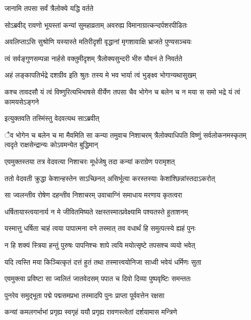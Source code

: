 \onelineshloka
{जानामि तपसा सर्वं त्रैलोक्ये यद्धि वर्तते} %

\twolineshloka
{सोऽब्रवीद् रावणो भूयस्तां कन्यां सुमहाव्रताम्}
{अवरुह्य विमानाग्रात्कन्दर्पशरपीडितः} %

\twolineshloka
{अवलिप्ताऽसि सुश्रोणि यस्यास्ते मतिरीदृशी}
{वृद्धानां मृगशावाक्षि भ्राजते पुण्यसञ्चयः} %

\twolineshloka
{त्वं सर्वङ्गुणसम्पन्ना नार्हसे वक्तुमीदृशम्}
{त्रैलोक्यसुन्दरी भीरु यौवनं ते निवर्तते} %

\twolineshloka
{अहं लङ्कापतिर्भद्रे दशग्रीव इति श्रुतः}
{तस्य मे भव भार्या त्वं भुङ्क्ष्व भोगान्यथासुखम्} %

\twolineshloka
{कश्च तावदसौ यं त्वं विष्णुरित्यभिभाषसे}
{वीर्येण तपसा चैव भोगेन च बलेन च न मया स समो भद्रे यं त्वं कामयसेऽङ्गने} %

\onelineshloka
{इत्युक्तवति तस्मिंस्तु वेदवत्यथ साऽब्रवीत्} %

\threelineshloka
{ैव भोगेन च बलेन च मा मैवमिति सा कन्या तमुवाच निशाचरम्}
{त्रैलोक्याधिपति विष्णुं सर्वलोकनमस्कृतम्}
{त्वदृते राक्षसेन्द्रान्यः कोऽवमन्येत बुद्धिमान्} %

\twolineshloka
{एवमुक्तस्तया तत्र वेदवत्या निशाचरः}
{मूर्धजेषु तदा कन्यां कराग्रेण परामृशत्} %

\twolineshloka
{ततो वेदवती क्रुद्धा केशान्हस्तेन साऽच्छिनत्}
{असिर्भूत्वा करस्तस्याः केशांश्छिन्नांस्तदाऽकरोत्} %

\twolineshloka
{सा ज्वलन्तीव रोषेण दहन्तीव निशाचरम्}
{उवाचाग्निं समाधाय मरणाय कृतत्वरा} %

\twolineshloka
{धर्षितायास्त्वयानार्य न मे जीवितमिष्यते}
{रक्षस्तस्मात्प्रवेक्ष्यामि पश्यतस्ते हुताशनम्} %

\twolineshloka
{यस्मात्तु धर्षिता चाहं त्वया पापात्मना वने}
{तस्मात् तव वधार्थं हि समुत्पत्स्ये ह्यहं पुनः} %

\twolineshloka
{न हि शक्यं स्त्रिया हन्तुं पुरुषः पापनिश्चः}
{शापे त्वयि मयोत्सृष्टे तपसश्च व्ययो भवेत्} %

\twolineshloka
{यदि त्वस्ति मया किञ्चित्कृतं दत्तं हुतं तथा}
{तस्मात्त्वयोनिजा साध्वी भवेयं धर्मिणः सुता} %

\twolineshloka
{एवमुक्त्वा प्रविष्टा सा ज्वलितं जातवेदसम्}
{पपात च दिवो दिव्या पुष्पवृष्टिः समन्ततः} %

\twolineshloka
{पुनरेव समुद्भूता पद्मे पद्मसमप्रभा}
{तस्मादपि पुनः प्राप्ता पूर्ववत्तेन रक्षसा} %

\twolineshloka
{कन्यां कमलगर्भाभां प्रगृह्य स्वगृहं ययौ}
{प्रगृह्य रावणस्त्वेतां दर्शयामास मन्त्रिणे} %

